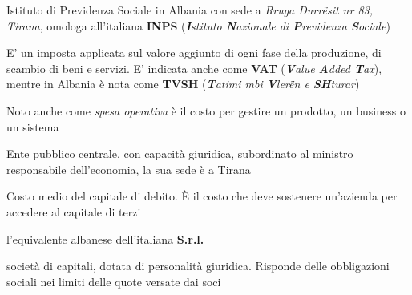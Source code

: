 \begin{acronym}
\begin{multicols}{2}
		   {\newline \small Istituto di Previdenza Sociale in Albania con sede a \textit{Rruga Durr\"esit nr 83, Tirana}\cite{issh_albania}, omologa all'italiana \textbf{INPS} (\textit{\textbf{I}stituto \textbf{N}azionale di \textbf{P}revidenza \textbf{S}ociale})\cite{inps_italia}\par}

		   {\newline \small E' un imposta applicata sul valore aggiunto di ogni fase della produzione, di scambio di beni e servizi. E' indicata anche come \textbf{VAT} (\textit{\textbf{V}alue \textbf{A}dded \textbf{T}ax}), mentre in Albania è nota come \textbf{TVSH} (\textit{\textbf{T}atimi mbi \textbf{V}ler\"en e \textbf{SH}turar}) \par}

		   {\newline \small Noto anche come \textit{spesa operativa} è il costo per gestire un prodotto, un business o un sistema \par}

		   {\newline \small Ente pubblico centrale, con capacità giuridica, subordinato al ministro responsabile dell'economia, la sua sede è a Tirana\par}

		   {\newline \small Costo medio del capitale di debito. \`E il costo che deve sostenere un'azienda per accedere al capitale di terzi\par}

		   {\newline \small l'equivalente albanese dell'italiana \textbf{\ac{S.r.l.}}\par}

		   {\newline \small società di capitali, dotata di personalità giuridica. Risponde delle obbligazioni sociali nei limiti delle quote versate dai soci\par}


\end{multicols}
\end{acronym}
